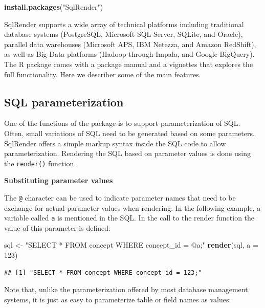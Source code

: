 \documentclass[11pt]{book}
\newenvironment{Shaded}{\begin{snugshade}}{\end{snugshade}}
\newcommand{\KeywordTok}[1]{\textcolor[rgb]{0.13,0.29,0.53}{\textbf{#1}}}
\newcommand{\DataTypeTok}[1]{\textcolor[rgb]{0.13,0.29,0.53}{#1}}
\newcommand{\DecValTok}[1]{\textcolor[rgb]{0.00,0.00,0.81}{#1}}
\newcommand{\StringTok}[1]{\textcolor[rgb]{0.31,0.60,0.02}{#1}}
\newcommand{\NormalTok}[1]{#1}
\begin{document}
\begin{Shaded}
\begin{Highlighting}[]
\KeywordTok{install.packages}\NormalTok{(}\StringTok{"SqlRender"}\NormalTok{)}
\end{Highlighting}
\end{Shaded}

SqlRender supports a wide array of technical platforms including
traditional database systems (PostgreSQL, Microsoft SQL Server, SQLite,
and Oracle), parallel data warehouses (Microsoft APS, IBM Netezza, and
Amazon RedShift), as well as Big Data platforms (Hadoop through Impala,
and Google BigQuery). The R package comes with a package manual and a
vignettes that explores the full functionality. Here we describer some
of the main features.

\subsection{SQL parameterization}\label{sql-parameterization}

One of the functions of the package is to support parameterization of
SQL. Often, small variations of SQL need to be generated based on some
parameters. SqlRender offers a simple markup syntax inside the SQL code
to allow parameterization. Rendering the SQL based on parameter values
is done using the \texttt{render()} function.

\textbf{Substituting parameter values}

The \texttt{@} character can be used to indicate parameter names that
need to be exchange for actual parameter values when rendering. In the
following example, a variable called \texttt{a} is mentioned in the SQL.
In the call to the render function the value of this parameter is
defined:

\begin{Shaded}
\begin{Highlighting}[]
\NormalTok{sql <-}\StringTok{ "SELECT * FROM concept WHERE concept_id = @a;"}
\KeywordTok{render}\NormalTok{(sql, }\DataTypeTok{a =} \DecValTok{123}\NormalTok{)}
\end{Highlighting}
\end{Shaded}

\begin{verbatim}
## [1] "SELECT * FROM concept WHERE concept_id = 123;"
\end{verbatim}

Note that, unlike the parameterization offered by most database
management systems, it is just as easy to parameterize table or field
names as values:
\end{document}
